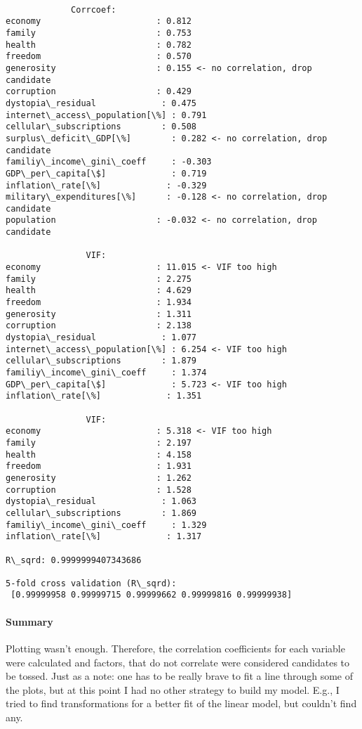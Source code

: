 \documentclass[11pt]{article}
\begin{document}
    \begin{Verbatim}[commandchars=\\\{\}]

             Corrcoef:
economy                       : 0.812 
family                        : 0.753 
health                        : 0.782 
freedom                       : 0.570 
generosity                    : 0.155 <- no correlation, drop candidate
corruption                    : 0.429 
dystopia\_residual             : 0.475 
internet\_access\_population[\%] : 0.791 
cellular\_subscriptions        : 0.508 
surplus\_deficit\_GDP[\%]        : 0.282 <- no correlation, drop candidate
familiy\_income\_gini\_coeff     : -0.303 
GDP\_per\_capita[\$]             : 0.719 
inflation\_rate[\%]             : -0.329 
military\_expenditures[\%]      : -0.128 <- no correlation, drop candidate
population                    : -0.032 <- no correlation, drop candidate

                VIF:
economy                       : 11.015 <- VIF too high
family                        : 2.275 
health                        : 4.629 
freedom                       : 1.934 
generosity                    : 1.311 
corruption                    : 2.138 
dystopia\_residual             : 1.077 
internet\_access\_population[\%] : 6.254 <- VIF too high
cellular\_subscriptions        : 1.879 
familiy\_income\_gini\_coeff     : 1.374 
GDP\_per\_capita[\$]             : 5.723 <- VIF too high
inflation\_rate[\%]             : 1.351 

                VIF:
economy                       : 5.318 <- VIF too high
family                        : 2.197 
health                        : 4.158 
freedom                       : 1.931 
generosity                    : 1.262 
corruption                    : 1.528 
dystopia\_residual             : 1.063 
cellular\_subscriptions        : 1.869 
familiy\_income\_gini\_coeff     : 1.329 
inflation\_rate[\%]             : 1.317 

R\_sqrd: 0.9999999407343686

5-fold cross validation (R\_sqrd):
 [0.99999958 0.99999715 0.99999662 0.99999816 0.99999938]

    \end{Verbatim}

    \paragraph{Summary}

Plotting wasn't enough. Therefore, the correlation coefficients for each
variable were calculated and factors, that do not correlate were
considered candidates to be tossed. Just as a note: one has to be really
brave to fit a line through some of the plots, but at this point I had
no other strategy to build my model. E.g., I tried to find
transformations for a better fit of the linear model, but couldn't find
any.\newline
\end{document}
